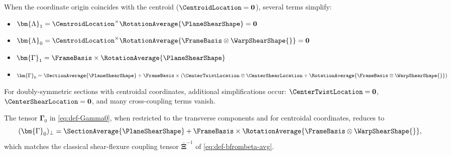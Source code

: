 \begin{remark}
When the coordinate origin coincides with the centroid ($\CentroidLocation = \mathbf{0}$), 
several terms simplify:
\begin{itemize}
\item $\bm{\Lambda}_1 = \CentroidLocation^\times \RotationAverage{\PlaneShearShape} = \mathbf{0}$
\item $\bm{\Lambda}_0 = \CentroidLocation^\times \RotationAverage{\FrameBasis\otimes\WarpShearShape{}} = \mathbf{0}$
\item $\bm{\Gamma}_1 = \FrameBasis \times \RotationAverage{\PlaneShearShape}$
\item $\bm{\Gamma}_0 = \SectionAverage{\PlaneShearShape} + \FrameBasis \times (\CenterTwistLocation \otimes \CenterShearLocation + \RotationAverage{\FrameBasis\otimes\WarpShearShape{}})$
\end{itemize}
For doubly-symmetric sections with centroidal coordinates, additional 
simplifications occur: $\CenterTwistLocation = \mathbf{0}$, $\CenterShearLocation = \mathbf{0}$, 
and many cross-coupling terms vanish.
\end{remark}

\begin{remark}
The tensor $\bm{\Gamma}_0$ in \eqref{eq:def-Gamma0}, when restricted to the 
transverse components and for centroidal coordinates, reduces to
\begin{equation}
(\bm{\Gamma}_0)_\perp = \SectionAverage{\PlaneShearShape} 
+ \FrameBasis \times \RotationAverage{\FrameBasis \otimes \WarpShearShape{}},
\end{equation}
which matches the classical shear-flexure coupling tensor 
$\bar{\bm{\Xi}}^{-1}$ of \eqref{eq:def-bfrombeta-avg}.
\end{remark}
